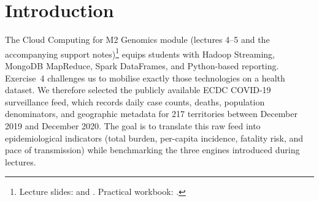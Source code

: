 \documentclass[12pt, a4paper]{article}
\newcommand{\coursename}{Data Integration and Big Data}
\begin{document}
\begin{abstract}
The COVID-19 pandemic generated a continuous stream of daily case and death records from every country. Turning these raw surveillance feeds into timely indicators is a core learning goal of the \coursename{} module. In this project we ingest the European Centre for Disease Prevention and Control (ECDC) worldwide case dataset (61{,}900 records covering December 2019--December 2020) and build three complementary processing pipelines: MongoDB aggregations and MapReduce jobs for interactive exploration, Hadoop Streaming jobs for batch processing, and a PySpark application for scalable analytics. The analysis surfaces epidemiological hotspots (United States, India, Brazil and France together account for $48\%$ of reported cases), highlights continent-level waves, and quantifies peak 14-day rolling incidence to prioritise interventions. We export curated aggregates for visualisation dashboards and compare runtimes across engines, observing that MongoDB MapReduce produces country totals in $\approx0.35\,\mathrm{s}$, Hadoop Streaming in $1.8\,\mathrm{s}$, and Spark in $2.4\,\mathrm{s}$ on the same local environment. The report summarises the methodology, presents the derived indicators, and discusses trade-offs between development velocity, flexibility, and execution performance when combining NoSQL, Hadoop, and Spark in a health analytics workflow.
\end{abstract}

\tableofcontents
\newpage



\section{Introduction}
The Cloud Computing for M2 Genomics module (lectures 4--5 and the accompanying support notes)\footnote{Lecture slides:  and . Practical workbook: .} equips students with Hadoop Streaming, MongoDB MapReduce, Spark DataFrames, and Python-based reporting. Exercise~4 challenges us to mobilise exactly those technologies on a health dataset. We therefore selected the publicly available ECDC COVID-19 surveillance feed, which records daily case counts, deaths, population denominators, and geographic metadata for 217 territories between December 2019 and December 2020. The goal is to translate this raw feed into epidemiological indicators (total burden, per-capita incidence, fatality risk, and pace of transmission) while benchmarking the three engines introduced during lectures.
\end{document}
